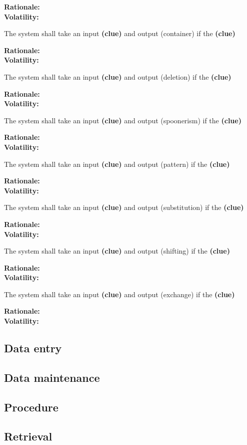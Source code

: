 \textbf{Rationale:}  \\
\textbf{Volatility:} 

\noindent\llap{\textbf{[R19/1]}}The system shall take an input \textbf{(clue)} and output (container) if the \textbf{(clue)}

\textbf{Rationale:}  \\
\textbf{Volatility:} 

\noindent\llap{\textbf{[R20/1]}}The system shall take an input \textbf{(clue)} and output (deletion) if the \textbf{(clue)}

\textbf{Rationale:}  \\
\textbf{Volatility:} 

\noindent\llap{\textbf{[R21/1]}}The system shall take an input \textbf{(clue)} and output (spoonerism) if the \textbf{(clue)}

\textbf{Rationale:}  \\
\textbf{Volatility:} 

\noindent\llap{\textbf{[R22/1]}}The system shall take an input \textbf{(clue)} and output (pattern) if the \textbf{(clue)}

\textbf{Rationale:}  \\
\textbf{Volatility:} 

\noindent\llap{\textbf{[R23/1]}}The system shall take an input \textbf{(clue)} and output (substitution) if the \textbf{(clue)}

\textbf{Rationale:}  \\
\textbf{Volatility:} 

\noindent\llap{\textbf{[R24/1]}}The system shall take an input \textbf{(clue)} and output (shifting) if the \textbf{(clue)}

\textbf{Rationale:}  \\
\textbf{Volatility:} 

\noindent\llap{\textbf{[R25/1]}}The system shall take an input \textbf{(clue)} and output (exchange) if the \textbf{(clue)}

\textbf{Rationale:}  \\
\textbf{Volatility:} 

\subsection{Data entry}

\subsection{Data maintenance}

\subsection{Procedure}

\subsection{Retrieval}


